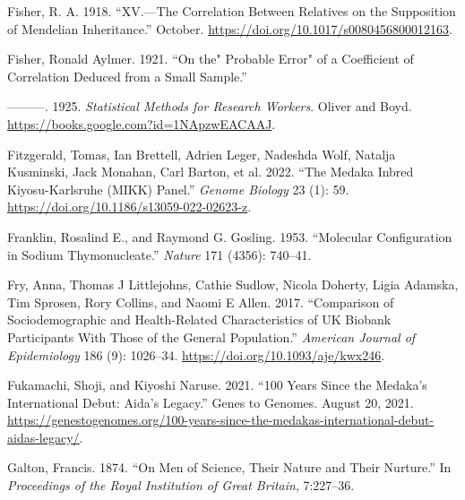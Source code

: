 \documentclass[
]{book}
\newlength{\cslhangindent}
\newlength{\cslentryspacingunit} %
\newenvironment{CSLReferences}[2] %
 {%
  \setlength{\parindent}{0pt}
  \ifodd #1
  \let\oldpar\par
  \def\par{\hangindent=\cslhangindent\oldpar}
  \fi
  \setlength{\parskip}{#2\cslentryspacingunit}
 }%
 {}
\begin{document}
\begin{CSLReferences}{1}{0}
\leavevmode{}%
Fisher, R. A. 1918. {``{XV}.---{The Correlation} Between {Relatives} on the {Supposition} of {Mendelian Inheritance}.''} October. \url{https://doi.org/10.1017/s0080456800012163}.

\leavevmode{}%
Fisher, Ronald Aylmer. 1921. {``On the{"} {Probable Error}{"} of a {Coefficient} of {Correlation Deduced} from a {Small Sample}.''}

\leavevmode{}%
---------. 1925. \emph{Statistical {Methods} for {Research Workers}}. {Oliver and Boyd}. \url{https://books.google.com?id=1NApzwEACAAJ}.

\leavevmode{}%
Fitzgerald, Tomas, Ian Brettell, Adrien Leger, Nadeshda Wolf, Natalja Kusminski, Jack Monahan, Carl Barton, et al. 2022. {``The {Medaka Inbred Kiyosu-Karlsruhe} ({MIKK}) Panel.''} \emph{Genome Biology} 23 (1): 59. \url{https://doi.org/10.1186/s13059-022-02623-z}.

\leavevmode{}%
Franklin, Rosalind E., and Raymond G. Gosling. 1953. {``Molecular Configuration in Sodium Thymonucleate.''} \emph{Nature} 171 (4356): 740--41.

\leavevmode{}%
Fry, Anna, Thomas J Littlejohns, Cathie Sudlow, Nicola Doherty, Ligia Adamska, Tim Sprosen, Rory Collins, and Naomi E Allen. 2017. {``Comparison of {Sociodemographic} and {Health-Related Characteristics} of {UK Biobank Participants With Those} of the {General Population}.''} \emph{American Journal of Epidemiology} 186 (9): 1026--34. \url{https://doi.org/10.1093/aje/kwx246}.

\leavevmode{}%
Fukamachi, Shoji, and Kiyoshi Naruse. 2021. {``100 Years Since the Medaka's International Debut: {Aida}'s Legacy.''} {Genes to Genomes}. August 20, 2021. \url{https://genestogenomes.org/100-years-since-the-medakas-international-debut-aidas-legacy/}.

\leavevmode{}%
Galton, Francis. 1874. {``On {Men} of {Science}, Their {Nature} and Their {Nurture}.''} In \emph{Proceedings of the {Royal Institution} of {Great Britain}}, 7:227--36.


\end{CSLReferences}
\end{document}
